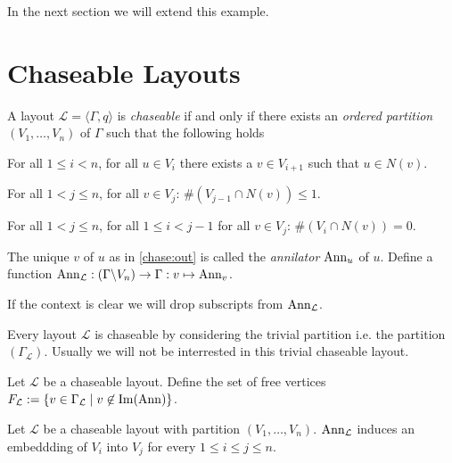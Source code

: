 In the next section we will extend this example.

\section{Chaseable Layouts}

\begin{definition}
	A layout $\mathcal{L}=\langle\Gamma,q\rangle$ is \emph{chaseable} if and
	only if there exists an \emph{ordered partition} $(V_{1},\ldots,V_{n})$
	of $\Gamma$ such that the following holds
	\begin{definitionlist}[C]
		\item\label{chase:out} For all $1\le i<n$, for all $u\in V_{i}$
		there exists a $v\in V_{i+1}$ such that $u\in N(v)$.  
		
		\item\label{chase:unique} For all $1<j\le n$, for all $v\in
		V_{j}$: $\#(V_{j-1} \cap N(v)) \le 1$. 
		
		\item\label{chase:clean} For all $1<j\le n$, for all $1\le i <
		j-1$ for all $v\in V_{j}$: $\#(V_{i} \cap N(v)) = 0$. 
	\end{definitionlist}
	
	The unique $v$ of $u$ as in \ref{chase:out} is called the
	\emph{annilator} $\operatorname{Ann}_{u}$ of $u$. Define a function
	$\operatorname{Ann}_{\mathcal{L}} : (\Gamma \backslash V_{n}) \rightarrow \Gamma : v
	\mapsto \operatorname{Ann}_{v}$.
\end{definition}

\begin{remark}
	If the context is clear we will drop subscripts from
	$\operatorname{Ann}_{\mathcal{L}}$.
	
	Every layout $\mathcal{L}$ is chaseable by considering the trivial
	partition i.e. the partition $(\Gamma_{\mathcal{L}})$. Usually we will
	not be interrested in this trivial chaseable layout.
\end{remark}

\begin{definition}
	Let $\mathcal{L}$ be a chaseable layout. Define the set of free vertices
	$F_{\mathcal{L}} := \{v\in\Gamma_{\mathcal{L}} \thickspace|\thickspace v\not\in
	\operatorname{Im}(\operatorname{Ann})\}$. 
\end{definition}

\begin{lemma}\label{lemma:embeddable}
	Let $\mathcal{L}$ be a chaseable layout with partition
	$(V_{1},\ldots,V_{n})$. $\operatorname{Ann}_{\mathcal{L}}$ induces an embeddding of
	$V_{i}$ into $V_{j}$ for every $1\le i\le j\le n$.
\end{lemma}

